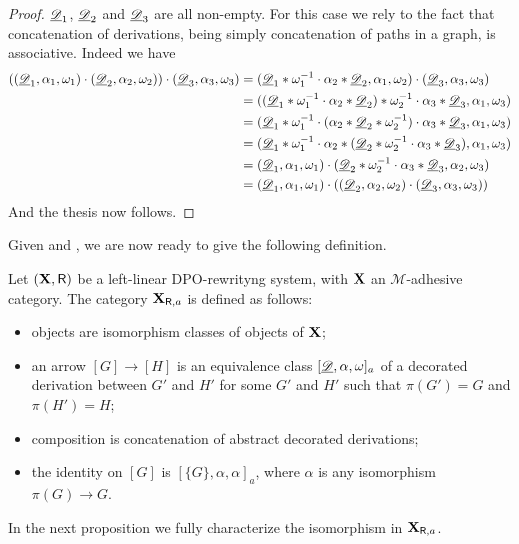 \begin{proof}
\smallskip \noindent  $\underline{\mathscr{D}}_1$, $\underline{\mathscr{D}}_2$ and $\underline{\mathscr{D}}_3$ are all non-empty. For this case we rely to the fact that concatenation of derivations, being simply concatenation of paths in a graph, is associative. Indeed we have
\begin{align*}
	((\underline{\mathscr{D}}_1, \alpha_1, \omega_1)\cdot (\underline{\mathscr{D}}_2, \alpha_2, \omega_2)) \cdot (\underline{\mathscr{D}}_3, \alpha_3, \omega_3)&=(\underline{\mathscr{D}}_1*\omega^{-1}_1\cdot \alpha_2*\underline{\mathscr{D}}_2, \alpha_1, \omega_2)\cdot (\underline{\mathscr{D}}_3, \alpha_3, \omega_3)\\&=((\underline{\mathscr{D}}_1*\omega^{-1}_1\cdot \alpha_2*\underline{\mathscr{D}}_2)*\omega^{-1}_2\cdot \alpha_3*\underline{\mathscr{D}}_3, \alpha_1, \omega_3 )\\&=(\underline{\mathscr{D}}_1*\omega^{-1}_1\cdot (\alpha_2*\underline{\mathscr{D}}_2*\omega^{-1}_2)\cdot \alpha_3*\underline{\mathscr{D}}_3, \alpha_1, \omega_3 )\\&=(\underline{\mathscr{D}}_1*\omega^{-1}_1\cdot \alpha_2*(\underline{\mathscr{D}}_2*\omega^{-1}_2 \cdot \alpha_3*\underline{\mathscr{D}}_3), \alpha_1, \omega_3)\\&=(\underline{\mathscr{D}}_1, \alpha_1, \omega_1) \cdot (\underline{\mathscr{D}}_2*\omega^{-1}_2 \cdot \alpha_3*\underline{\mathscr{D}}_3, \alpha_2, \omega_3)\\&=
	(\underline{\mathscr{D}}_1, \alpha_1, \omega_1) \cdot ((\underline{\mathscr{D}}_2, \alpha_2, \omega_2) \cdot (\underline{\mathscr{D}}_3, \alpha_3, \omega_3))
\end{align*}
And the thesis now follows.
\end{proof}

Given   and , we are now ready to give the following definition.

\begin{definition}
	Let $(\textbf {\textup{X}}, \mathsf{R})$ be a left-linear DPO-rewrityng system, with $\textbf {\textup{X}}$ an $\mathcal{M}$-adhesive category. The  category $\textbf {\textup{X}}_{\mathsf{R}, a}$ is defined as follows:
	\begin{itemize}
		\item objects are isomorphism classes of objects of $\textbf {\textup{X}}$;
		\item an arrow $[G]\to [H]$ is an equivalence class $[\underline{\mathscr{D}}, \alpha, \omega]_a$ of a decorated derivation between $G'$ and $H'$ for some $G'$ and $H'$ such that $\pi(G')=G$ and $\pi(H')=H$;
		\item composition is concatenation of abstract decorated derivations;
		\item the identity on $[G]$ is $[\{G\}, \alpha, \alpha]_a$, where $\alpha$ is any isomorphism $\pi(G)\to G$.	\end{itemize}
\end{definition}


In the next proposition we fully characterize the isomorphism in $\textbf {\textup{X}}_{\mathsf{R}, a}$.

